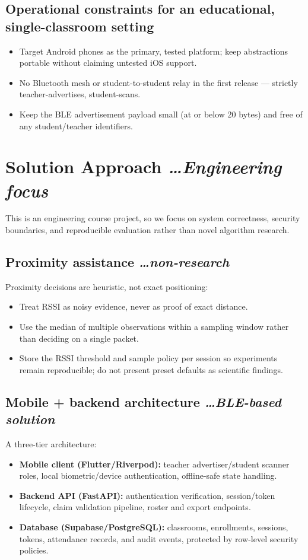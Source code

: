 \documentclass[11pt,a4paper]{article}
\newcommand{\BvrHint}[1]{%
  {\normalfont\normalsize\itshape\hfill #1}}
\begin{document}
\subsection{Operational constraints for an educational, single-classroom
setting}
\begin{itemize}[leftmargin=0.7cm]
    \item Target Android phones as the primary, tested platform; keep
    abstractions portable without claiming untested iOS support.
    \item No Bluetooth mesh or student-to-student relay in the first
    release --- strictly teacher-advertises, student-scans.
    \item Keep the BLE advertisement payload small (at or below 20 bytes)
    and free of any student/teacher identifiers.
\end{itemize}

\section{Solution Approach %
\BvrHint{\ldots Engineering focus}}
This is an engineering course project, so we focus on system correctness,
security boundaries, and reproducible evaluation rather than novel
algorithm research.

\subsection{Proximity assistance %
\BvrHint{\ldots non-research}}
Proximity decisions are heuristic, not exact positioning:
\begin{itemize}[leftmargin=0.7cm]
    \item Treat RSSI as noisy evidence, never as proof of exact distance.
    \item Use the median of multiple observations within a sampling
    window rather than deciding on a single packet.
    \item Store the RSSI threshold and sample policy per session so
    experiments remain reproducible; do not present preset defaults as
    scientific findings.
\end{itemize}

\subsection{Mobile + backend architecture %
\BvrHint{\ldots BLE-based solution}}
A three-tier architecture:
\begin{itemize}[leftmargin=0.7cm]
    \item \textbf{Mobile client (Flutter/Riverpod):} teacher
    advertiser/student scanner roles, local biometric/device
    authentication, offline-safe state handling.
    \item \textbf{Backend API (FastAPI):} authentication verification,
    session/token lifecycle, claim validation pipeline, roster and export
    endpoints.
    \item \textbf{Database (Supabase/PostgreSQL):} classrooms,
    enrollments, sessions, tokens, attendance records, and audit events,
    protected by row-level security policies.
\end{itemize}
\end{document}
